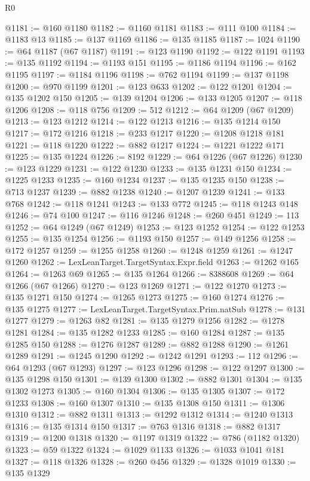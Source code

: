 \begin{lexlean}{R0}
\begin{coremodule}
@1181 := @160 @1180
@1182 := @1160 @1181
@1183 := @111 @100
@1184 := @1183 @13
@1185 := @137 @1169
@1186 := @135 @1185
@1187 := 1024
@1190 := @64 @1187 (@67 @1187)
@1191 := @123 @1190
@1192 := @122 @1191
@1193 := @135 @1192
@1194 := @1193 @151
@1195 := @1186 @1194
@1196 := @162 @1195
@1197 := @1184 @1196
@1198 := @762 @1194
@1199 := @137 @1198
@1200 := @970 @1199
@1201 := @123 @633
@1202 := @122 @1201
@1204 := @135 @1202 @150
@1205 := @139 @1204
@1206 := @133 @1205
@1207 := @118 @1206
@1208 := @118 @756
@1209 := 512
@1212 := @64 @1209 (@67 @1209)
@1213 := @123 @1212
@1214 := @122 @1213
@1216 := @135 @1214 @150
@1217 := @172 @1216
@1218 := @233 @1217
@1220 := @1208 @1218 @181
@1221 := @118 @1220
@1222 := @882 @1217
@1224 := @1221 @1222 @171
@1225 := @135 @1224
@1226 := 8192
@1229 := @64 @1226 (@67 @1226)
@1230 := @123 @1229
@1231 := @122 @1230
@1233 := @135 @1231 @150
@1234 := @1225 @1233
@1235 := @160 @1234
@1237 := @135 @1235 @150
@1238 := @713 @1237
@1239 := @882 @1238
@1240 := @1207 @1239
@1241 := @133 @768
@1242 := @118 @1241
@1243 := @133 @772
@1245 := @118 @1243 @148
@1246 := @74 @100
@1247 := @116 @1246
@1248 := @260 @451
@1249 := 113
@1252 := @64 @1249 (@67 @1249)
@1253 := @123 @1252
@1254 := @122 @1253
@1255 := @135 @1254
@1256 := @1193 @150
@1257 := @149 @1256
@1258 := @172 @1257
@1259 := @1255 @1258
@1260 := @1248 @1259
@1261 := @1247 @1260
@1262 := LexLeanTarget.TargetSyntax.Expr.field
@1263 := @1262 @165
@1264 := @1263 @69
@1265 := @135 @1264
@1266 := 8388608
@1269 := @64 @1266 (@67 @1266)
@1270 := @123 @1269
@1271 := @122 @1270
@1273 := @135 @1271 @150
@1274 := @1265 @1273
@1275 := @160 @1274
@1276 := @135 @1275
@1277 := LexLeanTarget.TargetSyntax.Prim.natSub
@1278 := @131 @1277
@1279 := @1263 @82
@1281 := @135 @1279 @1256
@1282 := @1278 @1281
@1284 := @135 @1282 @1233
@1285 := @160 @1284
@1287 := @135 @1285 @150
@1288 := @1276 @1287
@1289 := @882 @1288
@1290 := @1261 @1289
@1291 := @1245 @1290
@1292 := @1242 @1291
@1293 := 112
@1296 := @64 @1293 (@67 @1293)
@1297 := @123 @1296
@1298 := @122 @1297
@1300 := @135 @1298 @150
@1301 := @139 @1300
@1302 := @882 @1301
@1304 := @135 @1302 @1273
@1305 := @160 @1304
@1306 := @135 @1305
@1307 := @172 @1233
@1308 := @160 @1307
@1310 := @135 @1308 @150
@1311 := @1306 @1310
@1312 := @882 @1311
@1313 := @1292 @1312
@1314 := @1240 @1313
@1316 := @135 @1314 @150
@1317 := @763 @1316
@1318 := @882 @1317
@1319 := @1200 @1318
@1320 := @1197 @1319
@1322 := @786 (@1182 @1320)
@1323 := @59 @1322
@1324 := @1029 @1133
@1326 := @1033 @1041 @181
@1327 := @118 @1326
@1328 := @260 @456
@1329 := @1328 @1019
@1330 := @135 @1329

\end{coremodule}
\end{lexlean}
